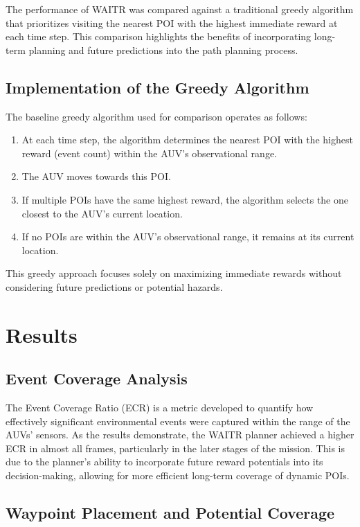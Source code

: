 \documentclass[conference]{IEEEtran}
\begin{document}
The performance of WAITR was compared against a traditional greedy algorithm that prioritizes visiting the nearest POI with the highest immediate reward at each time step. This comparison highlights the benefits of incorporating long-term planning and future predictions into the path planning process.

\subsection{Implementation of the Greedy Algorithm}

The baseline greedy algorithm used for comparison operates as follows:

\begin{enumerate}
\item At each time step, the algorithm determines the nearest POI with the highest reward (event count) within the AUV's observational range.
\item The AUV moves towards this POI. 
\item If multiple POIs have the same highest reward, the algorithm selects the one closest to the AUV's current location.
\item If no POIs are within the AUV's observational range, it remains at its current location.
\end{enumerate}

This greedy approach focuses solely on maximizing immediate rewards without considering future predictions or potential hazards.

\section{Results}

\subsection{Event Coverage Analysis}
The Event Coverage Ratio (ECR) is a metric developed to quantify how effectively significant environmental events were captured within the range of the AUVs’ sensors. As the results demonstrate, the WAITR planner achieved a higher ECR in almost all frames, particularly in the later stages of the mission. This is due to the planner’s ability to incorporate future reward potentials into its decision-making, allowing for more efficient long-term coverage of dynamic POIs.

\subsection{Waypoint Placement and Potential Coverage}
\end{document}
